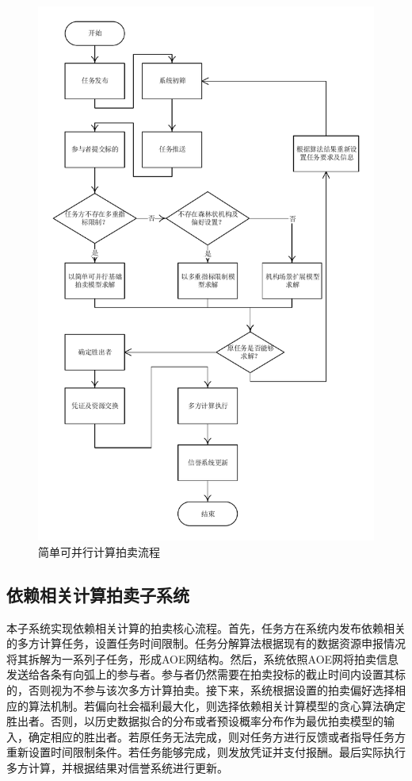\documentclass[promaster]{thesis-uestc}
\begin{document}
\begin{figure}[H]
    \includegraphics[width=350pt]{pic/kebingxing.pdf}
    \caption{简单可并行计算拍卖流程}
\end{figure}

\subsection{依赖相关计算拍卖子系统}
本子系统实现依赖相关计算的拍卖核心流程。首先，任务方在系统内发布依赖相关的多方计算任务，设置任务时间限制。任务分解算法根据现有的数据资源申报情况将其拆解为一系列子任务，形成AOE网结构。然后，系统依照AOE网将拍卖信息发送给各条有向弧上的参与者。参与者仍然需要在拍卖投标的截止时间内设置其标的，否则视为不参与该次多方计算拍卖。接下来，系统根据设置的拍卖偏好选择相应的算法机制。若偏向社会福利最大化，则选择依赖相关计算模型的贪心算法确定胜出者。否则，以历史数据拟合的分布或者预设概率分布作为最优拍卖模型的输入，确定相应的胜出者。若原任务无法完成，则对任务方进行反馈或者指导任务方重新设置时间限制条件。若任务能够完成，则发放凭证并支付报酬。最后实际执行多方计算，并根据结果对信誉系统进行更新。
\end{document}
